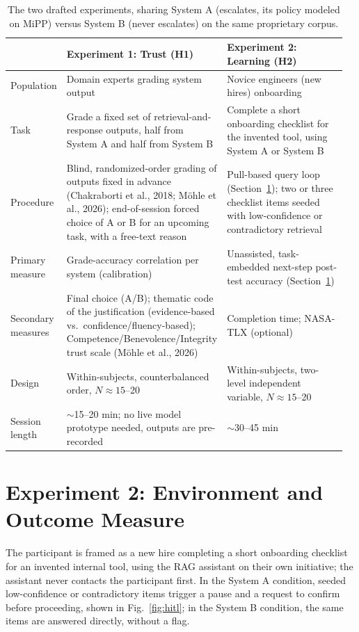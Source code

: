 \documentclass[9pt,conference]{IEEEtran}
\begin{document}
\begin{table}[t]
\centering\small
\begin{tabular}{@{}p{0.10\linewidth}p{0.43\linewidth}p{0.43\linewidth}@{}}
\toprule
 & \textbf{Experiment 1: Trust (H1)} & \textbf{Experiment 2: Learning (H2)} \\
\midrule
Population & Domain experts grading system output & Novice engineers (new hires) onboarding \\
Task & Grade a fixed set of retrieval-and-response outputs, half from System A and half from System B & Complete a short onboarding checklist for the invented tool, using System A or System B \\
Procedure & Blind, randomized-order grading of outputs fixed in advance (Chakraborti et al., 2018; Möhle et al., 2026); end-of-session forced choice of A or B for an upcoming task, with a free-text reason & Pull-based query loop (Section~\ref{sec:env}); two or three checklist items seeded with low-confidence or contradictory retrieval \\
Primary measure & Grade-accuracy correlation per system (calibration) & Unassisted, task-embedded next-step post-test accuracy (Section~\ref{sec:env}) \\
Secondary measures & Final choice (A/B); thematic code of the justification (evidence-based vs.\ confidence/fluency-based); Competence/Benevolence/Integrity trust scale (Möhle et al., 2026) & Completion time; NASA-TLX (optional) \\
Design & Within-subjects, counterbalanced order, $N \approx 15$--20 & Within-subjects, two-level independent variable, $N \approx 15$--20 \\
Session length & $\sim$15--20 min; no live model prototype needed, outputs are pre-recorded & $\sim$30--45 min \\
\bottomrule
\end{tabular}
\caption{The two drafted experiments, sharing System A (escalates, its policy modeled on MiPP) versus System B (never escalates) on the same proprietary corpus.}
\label{tab:experiments}
\end{table}

\section{Experiment 2: Environment and Outcome Measure}
\label{sec:env}

The participant is framed as a new hire completing a short onboarding
checklist for an invented internal tool, using the RAG assistant on
their own initiative; the assistant never contacts the participant
first. In the System A condition, seeded low-confidence or
contradictory items trigger a pause and a request to confirm before
proceeding, shown in Fig.~\ref{fig:hitl}; in the System B condition,
the same items are answered directly, without a flag.
\end{document}
